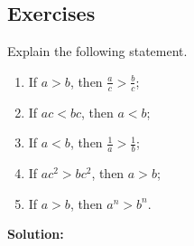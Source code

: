 \documentclass[
	12pt, %
	fleqn, %
	a4paper, %
]{LegrandOrangeBook}
\begin{document}
\subsection{Exercises}
\begin{exercise}
    Explain the following statement.
    \begin{enumerate}
        \item If \( a > b \), then \( \frac{a}{c} > \frac{b}{c} \);
        \item If \( ac < bc \), then \( a < b \);
        \item If \( a < b \), then \( \frac{1}{a} > \frac{1}{b} \);
        \item If \( ac^2 > bc^2 \), then \( a > b \);
        \item If \( a > b \), then \( a^n > b^n \).
    \end{enumerate}
\end{exercise}

\textbf{Solution:}
\end{document}
